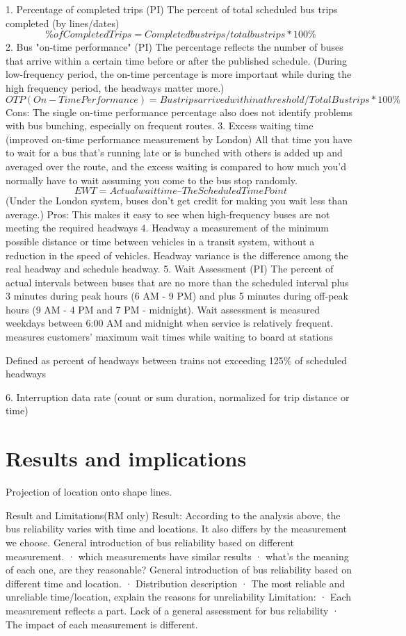 \documentclass[12pt,journal,compsoc]{IEEEtran}
\begin{document}
1.     Percentage of completed trips (PI)
The percent of total scheduled bus trips completed (by lines/dates)
$$\% of Completed Trips = Completed bus trips/total bus trips * 100\%$$
2.     Bus "on-time performance" (PI)
The percentage reflects the number of buses that arrive within a certain time before or after the published schedule.
(During low-frequency period, the on-time percentage is more important while during the high frequency period, the headways matter more.)
$$OTP (On-Time Performance) = Bus trips arrived within a threshold / Total Bus trips * 100\%$$
Cons:
The single on-time performance percentage also does not identify problems with bus bunching, especially on frequent routes.
3.     Excess waiting time (improved on-time performance measurement by London)
All that time you have to wait for a bus that's running late or is bunched with others is added up and averaged over the route, and the excess waiting is compared to how much you'd normally have to wait assuming you come to the bus stop randomly.
$$EWT = Actual wait time – The Scheduled Time Point$$
(Under the London system, buses don't get credit for making you wait less than average.)
Pros: This makes it easy to see when high-frequency buses are not meeting the required headways
4.     Headway
a measurement of the minimum possible distance or time between vehicles in a transit system, without a reduction in the speed of vehicles.
Headway variance is the difference among the real headway and schedule headway.
5.     Wait Assessment (PI)
The percent of actual intervals between buses that are no more than the scheduled interval plus 3 minutes during peak hours (6 AM - 9 PM) and plus 5 minutes during off-peak hours (9 AM - 4 PM and 7 PM - midnight). Wait assessment is measured weekdays between 6:00 AM and midnight when service is relatively frequent.
measures customers’ maximum wait times while waiting to board at stations 

Defined as percent of headways between trains not exceeding 125$\%$ of scheduled headways 

6.     Interruption data rate (count or sum duration, normalized for trip distance or time)

\section{Results and implications}

Projection of location onto shape lines.



 
Result and Limitations(RM only)
Result:
According to the analysis above, the bus reliability varies with time and locations. It also differs by the measurement we choose.
General introduction of bus reliability based on different measurement.
·      which measurements have similar results
·      what’s the meaning of each one, are they reasonable?
General introduction of bus reliability based on different time and location.
·      Distribution description
·      The most reliable and unreliable time/location, explain the reasons for unreliability
Limitation:
·      Each measurement reflects a part. Lack of a general assessment for bus reliability
·      The impact of each measurement is different.
\end{document}
